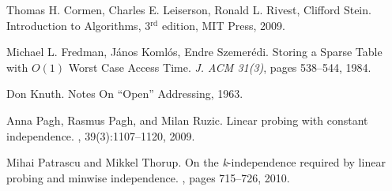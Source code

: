 \documentclass[11pt]{article}
\theoremstyle{definition}
\begin{document}

\begin{thebibliography}{PPR09}

Thomas H. Cormen, Charles E. Leiserson, Ronald L. Rivest, Clifford Stein.
Introduction to Algorithms, 3$^{\text{rd}}$ edition, MIT Press, 2009.

Michael L. Fredman, J\'{a}nos Koml\'{o}s, Endre Szemer\'{e}di.
Storing a Sparse Table with $O(1)$ Worst Case Access Time. 
{\em J. ACM 31(3)}, pages 538--544, 1984.

Don Knuth.
\newblock Notes On ``Open'' Addressing, 1963.

Anna Pagh, Rasmus Pagh, and Milan Ruzic.
\newblock Linear probing with constant independence.
, 39(3):1107--1120, 2009.

Mihai Patrascu and Mikkel Thorup.
\newblock On the \emph{k}-independence required by linear probing and minwise
  independence.
, pages 715--726, 2010.

\end{thebibliography}
\end{document}
